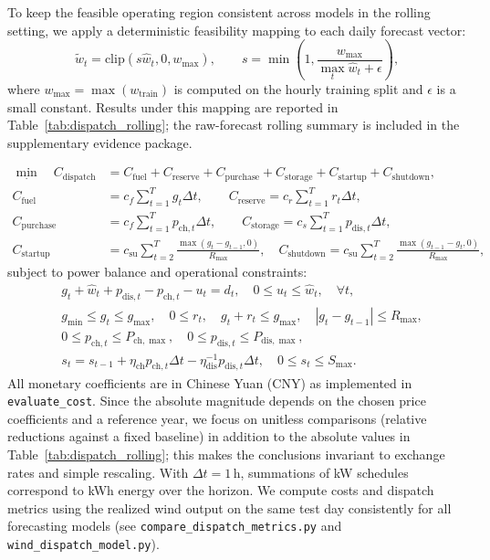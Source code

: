 \documentclass[review,3p,times]{elsarticle}
\begin{document}
To keep the feasible operating region consistent across models in the rolling setting, we apply a deterministic feasibility mapping to each daily forecast vector:
\begin{equation}
\tilde{w}_t=\mathrm{clip}(s\hat{w}_t,0,w_{\max}),\qquad
s=\min\left(1,\frac{w_{\max}}{\max_t \hat{w}_t + \epsilon}\right),
\label{eq:dispatch_feas_map}
\end{equation}
where $w_{\max}=\max(w_{\text{train}})$ is computed on the hourly training split and $\epsilon$ is a small constant. Results under this mapping are reported in Table~\ref{tab:dispatch_rolling}; the raw-forecast rolling summary is included in the supplementary evidence package.

\begin{align}
\min_{\cdot}\quad C_{\text{dispatch}} &= C_{\text{fuel}} + C_{\text{reserve}} + C_{\text{purchase}} + C_{\text{storage}} + C_{\text{startup}} + C_{\text{shutdown}}, \label{eq:dispatch_obj}\\
C_{\text{fuel}} &= c_f\sum_{t=1}^{T} g_t\Delta t,\qquad
C_{\text{reserve}} = c_r\sum_{t=1}^{T} r_t\Delta t, \nonumber\\
C_{\text{purchase}} &= c_f\sum_{t=1}^{T} p_{\text{ch},t}\Delta t,\qquad
C_{\text{storage}} = c_s\sum_{t=1}^{T} p_{\text{dis},t}\Delta t, \nonumber\\
C_{\text{startup}} &= c_{\text{su}}\sum_{t=2}^{T}\frac{\max(g_t-g_{t-1},0)}{R_{\max}},\quad
C_{\text{shutdown}} = c_{\text{su}}\sum_{t=2}^{T}\frac{\max(g_{t-1}-g_t,0)}{R_{\max}}, \nonumber
\end{align}
subject to power balance and operational constraints:
\begin{align}
& g_t + \hat{w}_t + p_{\text{dis},t} - p_{\text{ch},t} - u_t = d_t,\quad 0\le u_t \le \hat{w}_t,\quad \forall t, \label{eq:dispatch_balance}\\
& g_{\min}\le g_t\le g_{\max},\quad 0\le r_t,\quad g_t+r_t\le g_{\max},\quad |g_t-g_{t-1}|\le R_{\max}, \label{eq:dispatch_gen}\\
& 0\le p_{\text{ch},t}\le P_{\text{ch},\max},\quad 0\le p_{\text{dis},t}\le P_{\text{dis},\max}, \label{eq:dispatch_storage_power}\\
& s_t = s_{t-1} + \eta_{\text{ch}}p_{\text{ch},t}\Delta t - \eta_{\text{dis}}^{-1}p_{\text{dis},t}\Delta t,\quad 0\le s_t\le S_{\max}. \label{eq:dispatch_storage_soc}
\end{align}
All monetary coefficients are in Chinese Yuan (CNY) as implemented in \texttt{evaluate\_cost}. Since the absolute magnitude depends on the chosen price coefficients and a reference year, we focus on unitless comparisons (relative reductions against a fixed baseline) in addition to the absolute values in Table~\ref{tab:dispatch_rolling}; this makes the conclusions invariant to exchange rates and simple rescaling. With $\Delta t=1$\,h, summations of kW schedules correspond to kWh energy over the horizon. We compute costs and dispatch metrics using the realized wind output on the same test day consistently for all forecasting models (see \texttt{compare\_dispatch\_metrics.py} and \texttt{wind\_dispatch\_model.py}).
\end{document}
